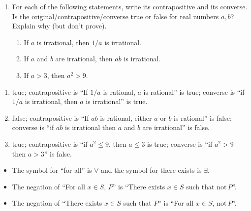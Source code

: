 \documentclass[12pt]{amsart}
\numberwithin{equation}{section}
\theoremstyle{plain} %
\theoremstyle{definition}
\theoremstyle{remark}
\begin{document}
\begin{enumerate}
\item For each of the following statements, write its contrapositive and its converse. Is the original/contrapositive/converse true or false for real numbers $a,b$? Explain why (but don't prove). 
\begin{enumerate}
\item If $a$ is irrational, then $1/a$ is irrational.
\item If $a$ and $b$ are irrational, then $ab$ is irrational.
\item If $a>3$, then $a^2>9$.
\end{enumerate}
\end{enumerate}

\begin{framed}
\begin{enumerate}
\item true; contrapositive is ``If $1/a$ is rational, $a$ is rational'' is true; converse is ``if $1/a$ is irrational, then $a$ is irrational'' is true.
\item false; contrapositive is ``If $ab$ is rational, either $a$ or $b$ is rational'' is false; converse is ``if $ab$ is irrational then $a$ and $b$ are irrational'' is false.
\item true; contrapositive is ``if $a^2 \leq 9$, then $a\leq 3$ is true; converse is ``if $a^2>9$ then $a>3$'' is false.
\end{enumerate}
\end{framed}


\begin{itemize}
\item The symbol for ``for all'' is $\forall$\index{$\forall$} and the symbol for there exists is $\exists$.\index{$\exists$}
\item The negation of ``For all $x\in S$, $P$'' is ``There exists $x\in S$ such that $\mathrm{not} \, P$''.
\item The negation of ``There exists $x\in S$ such that $P$'' is ``For all $x\in S$, $\mathrm{not} \, P$''.
\end{itemize}
\end{document}

